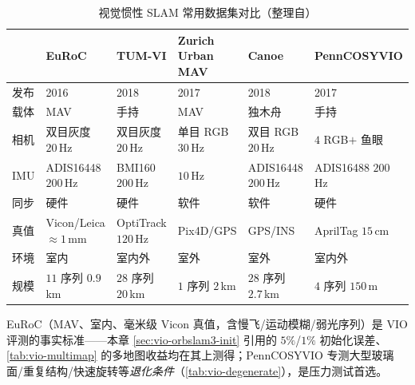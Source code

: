 \begin{table}[H]\centering\small
\caption{视觉惯性 SLAM 常用数据集对比（整理自\cite{campos2021orbslam3}）}
\label{tab:vio-datasets}
\begin{tabular}{llllll}
\toprule
 & EuRoC & TUM-VI & \shortstack{Zurich\\Urban MAV} & Canoe & PennCOSYVIO \\
\midrule
发布 & 2016 & 2018 & 2017 & 2018 & 2017 \\
载体 & MAV & 手持 & MAV & 独木舟 & 手持 \\
相机 & \shortstack{双目灰度\\$20\,$Hz} & \shortstack{双目灰度\\$20\,$Hz} & \shortstack{单目 RGB\\$30\,$Hz} & \shortstack{双目 RGB\\$20\,$Hz} & \shortstack{$4$ RGB$+$\\鱼眼} \\
IMU & \shortstack{ADIS16448\\$200\,$Hz} & \shortstack{BMI160\\$200\,$Hz} & $10\,$Hz & \shortstack{ADIS16448\\$200\,$Hz} & \shortstack{ADIS16488\\$200\,$Hz} \\
同步 & 硬件 & 硬件 & 软件 & 软件 & 硬件 \\
真值 & \shortstack{Vicon/Leica\\$\approx1\,$mm} & \shortstack{OptiTrack\\$120\,$Hz} & Pix4D/GPS & GPS/INS & \shortstack{AprilTag\\$15\,$cm} \\
环境 & 室内 & 室内外 & 室外 & 室外 & 室内外 \\
规模 & \shortstack{$11$ 序列\\$0.9\,$km} & \shortstack{$28$ 序列\\$20\,$km} & \shortstack{$1$ 序列\\$2\,$km} & \shortstack{$28$ 序列\\$2.7\,$km} & \shortstack{$4$ 序列\\$150\,$m} \\
\bottomrule
\end{tabular}
\end{table}

\noindent EuRoC（MAV、室内、毫米级 Vicon 真值，含慢飞/运动模糊/弱光序列）是 VIO 评测的事实标准——本章 \cref{sec:vio-orbslam3-init} 引用的 $5\%$/$1\%$ 初始化误差、\cref{tab:vio-multimap} 的多地图收益均在其上测得；PennCOSYVIO 专测大型玻璃面/重复结构/快速旋转等\emph{退化条件}（\cref{tab:vio-degenerate}），是压力测试首选。

